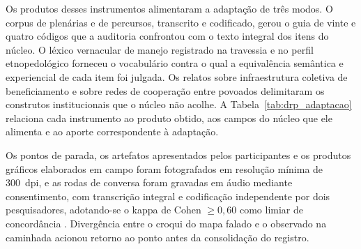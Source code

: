\documentclass[preprint,authoryear,12pt]{elsarticle}
\begin{document}
Os produtos desses instrumentos alimentaram a adaptação de três modos. O corpus de plenárias e de percursos, transcrito e codificado, gerou o guia de vinte e quatro códigos que a auditoria confrontou com o texto integral dos itens do núcleo. O léxico vernacular de manejo registrado na travessia e no perfil etnopedológico forneceu o vocabulário contra o qual a equivalência semântica e experiencial de cada item foi julgada. Os relatos sobre infraestrutura coletiva de beneficiamento e sobre redes de cooperação entre povoados delimitaram os construtos institucionais que o núcleo não acolhe. A Tabela~\ref{tab:drp_adaptacao} relaciona cada instrumento ao produto obtido, aos campos do núcleo que ele alimenta e ao aporte correspondente à adaptação.

Os pontos de parada, os artefatos apresentados pelos participantes e os produtos gráficos elaborados em campo foram fotografados em resolução mínima de 300~dpi, e as rodas de conversa foram gravadas em áudio mediante consentimento, com transcrição integral e codificação independente por dois pesquisadores, adotando-se o kappa de Cohen $\geq 0{,}60$ como limiar de concordância \citep{Landis1977}. Divergência entre o croqui do mapa falado e o observado na caminhada acionou retorno ao ponto antes da consolidação do registro.
\end{document}
